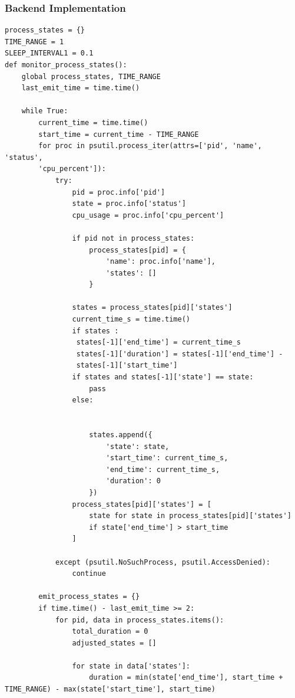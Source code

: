 \documentclass[12pt]{article}
\begin{document}
\subsubsection{Backend Implementation}

\begin{verbatim}
process_states = {}  
TIME_RANGE = 1  
SLEEP_INTERVAL1 = 0.1  
def monitor_process_states():
    global process_states, TIME_RANGE
    last_emit_time = time.time()  

    while True:
        current_time = time.time() 
        start_time = current_time - TIME_RANGE  
        for proc in psutil.process_iter(attrs=['pid', 'name', 'status',
        'cpu_percent']):
            try:
                pid = proc.info['pid']
                state = proc.info['status']
                cpu_usage = proc.info['cpu_percent']

                if pid not in process_states:
                    process_states[pid] = {
                        'name': proc.info['name'],
                        'states': []
                    }

                states = process_states[pid]['states']
                current_time_s = time.time()
                if states :
                 states[-1]['end_time'] = current_time_s
                 states[-1]['duration'] = states[-1]['end_time'] -
                 states[-1]['start_time']
                if states and states[-1]['state'] == state:
                    pass
                else:

                    
                    states.append({
                        'state': state,
                        'start_time': current_time_s,
                        'end_time': current_time_s,
                        'duration': 0  
                    })
                process_states[pid]['states'] = [
                    state for state in process_states[pid]['states']
                    if state['end_time'] > start_time  
                ]
                    
            except (psutil.NoSuchProcess, psutil.AccessDenied):
                continue

        emit_process_states = {}
        if time.time() - last_emit_time >= 2:
            for pid, data in process_states.items():
                total_duration = 0
                adjusted_states = []

                for state in data['states']:
                    duration = min(state['end_time'], start_time + TIME_RANGE) - max(state['start_time'], start_time)


\end{verbatim}
\end{document}
